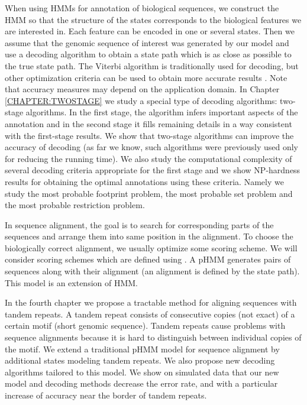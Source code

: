 When using HMMs for annotation of biological sequences, we construct the
HMM so  that the structure of the states corresponds to the biological features we
are interested in.
Each feature can be encoded in one or several states.  Then we assume that the genomic sequence of interest was generated by our model and use a decoding
algorithm to obtain a state path which is as close as possible to the true
state path. The Viterbi algorithm
\cite{Durbin1998} is traditionally used for decoding, but other optimization criteria can be used to obtain more
accurate results \cite{Brown2010, Gross2007, Nanasi2010, Truszkowski2011}. Note that 
accuracy measures may depend on the application domain.  In Chapter
\ref{CHAPTER:TWOSTAGE} we study a special type of decoding algorithms: two-stage 
algorithms. In the first stage, the algorithm infers important aspects of
the annotation and in the second stage it fills remaining details in a way
consistent with the first-stage results.  We show that  two-stage
algorithms can improve the accuracy of decoding (as far we know, such
algorithms were previously used only for reducing the running time). We also
study the computational complexity of several decoding criteria appropriate for
the first stage and we show NP-hardness results for obtaining the optimal
annotations using these criteria. Namely we study the most probable footprint
problem, the most probable set problem and the most probable restriction
problem. 

In sequence alignment, the goal is to search for
corresponding  parts of the sequences and arrange them into same position in the
alignment.  To choose the biologically correct alignment, we usually optimize some
scoring scheme. We will consider scoring schemes which are  defined using
. A pHMM generates pairs of
sequences along with their alignment (an alignment is defined by the state
path).  This model is an extension of HMM. 


In the fourth chapter we propose a tractable method for aligning sequences with
tandem repeats. A tandem repeat consists of consecutive copies (not exact) of a
certain motif (short genomic sequence). Tandem repeats cause problems with
sequence alignments because it is hard to distinguish between individual copies of the motif.
We extend a traditional pHMM model for sequence alignment by additional states
modeling tandem repeats. We also propose new decoding algorithms tailored to
this model. We show on simulated data that our new model and decoding methods
decrease the error rate, and with a particular increase of accuracy near the border of tandem repeats.

